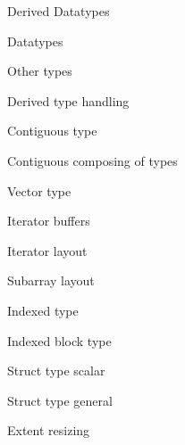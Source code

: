 \documentclass[11pt,headernav]{beamer}
\begin{document}
 {Derived Datatypes}

\begin{numberedframe}{Datatypes}
  
\end{numberedframe}
\begin{numberedframe}{Other types}
  
\end{numberedframe}
\begin{numberedframe}{Derived type handling}
  
\end{numberedframe}
\begin{numberedframe}{Contiguous type}
  
\end{numberedframe}
\begin{numberedframe}{Contiguous composing of types}
  
\end{numberedframe}
\begin{numberedframe}{Vector type}
  
\end{numberedframe}
\begin{numberedframe}{Iterator buffers}
  
\end{numberedframe}
\begin{numberedframe}{Iterator layout}
  
\end{numberedframe}
\begin{numberedframe}{Subarray layout}
  
\end{numberedframe}
\begin{numberedframe}{Indexed type}
  
\end{numberedframe}
\begin{numberedframe}{Indexed block type}
  
\end{numberedframe}
\begin{numberedframe}{Struct type scalar}
  
\end{numberedframe}
\begin{numberedframe}{Struct type general}
  
\end{numberedframe}
\begin{numberedframe}{Extent resizing}
    
\end{numberedframe}
\end{document}
